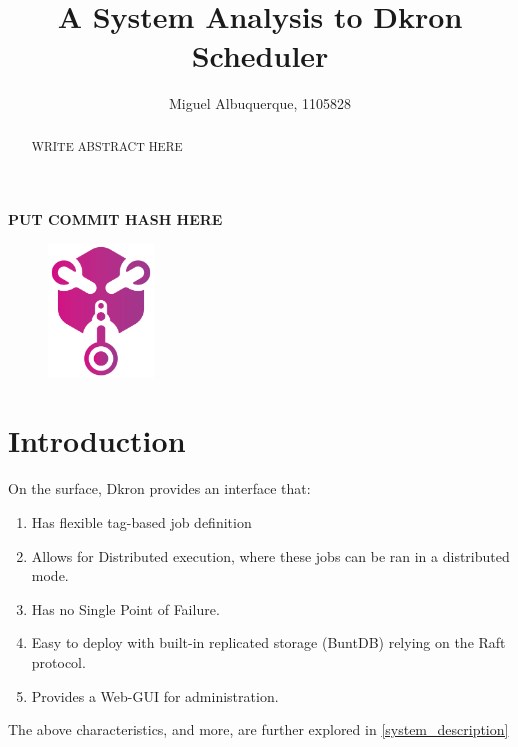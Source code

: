 \documentclass[runningheads]{llncs}
\begin{document}
%
\title{A System Analysis to Dkron Scheduler}


%
%
\author{Miguel Albuquerque, 1105828}
%
\maketitle              %
%
\begin{abstract}
WRITE ABSTRACT HERE
\end{abstract}

\par
{}
\par
{}\textbf{PUT COMMIT HASH HERE}

%
%
%
\begin{figure}
\centering
\includegraphics[width=0.25\textwidth]{media/dkron-logo.png}
\end{figure}
\section{Introduction}

On the surface, Dkron provides an interface that:
\begin{enumerate}
    \item Has flexible tag-based job definition
    \item Allows for Distributed execution, where these jobs can be ran in a distributed mode. %
    \item Has no Single Point of Failure.
    \item Easy to deploy with built-in replicated storage (BuntDB) relying on the Raft protocol.
    \item Provides a Web-GUI for administration.
\end{enumerate}
The above characteristics, and more, are further explored in \ref{system_description}
\end{document}
